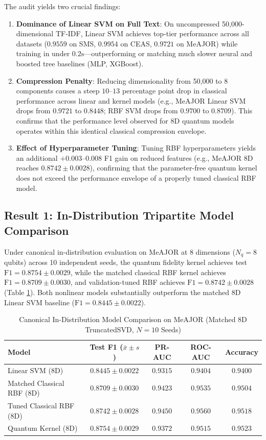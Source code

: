 \documentclass[10pt,twocolumn,letterpaper]{article}
\begin{document}
The audit yields two crucial findings:
\begin{enumerate}
    \item \textbf{Dominance of Linear SVM on Full Text}: On uncompressed 50,000-dimensional TF-IDF, Linear SVM achieves top-tier performance across all datasets ($0.9559$ on SMS, $0.9954$ on CEAS, $0.9721$ on MeAJOR) while training in under $0.2\text{s}$---outperforming or matching much slower neural and boosted tree baselines (MLP, XGBoost).
    \item \textbf{Compression Penalty}: Reducing dimensionality from 50,000 to 8 components causes a steep $10\text{--}13$ percentage point drop in classical performance across linear and kernel models (e.g., MeAJOR Linear SVM drops from $0.9721$ to $0.8448$; RBF SVM drops from $0.9700$ to $0.8709$). This confirms that the performance level observed for 8D quantum models operates within this identical classical compression envelope.
    \item \textbf{Effect of Hyperparameter Tuning}: Tuning RBF hyperparameters yields an additional $+0.003\text{--}0.008$ F1 gain on reduced features (e.g., MeAJOR 8D reaches $0.8742 \pm 0.0028$), confirming that the parameter-free quantum kernel does not exceed the performance envelope of a properly tuned classical RBF model.
\end{enumerate}

\subsection{Result 1: In-Distribution Tripartite Model Comparison}
Under canonical in-distribution evaluation on MeAJOR at 8 dimensions ($N_q = 8$ qubits) across 10 independent seeds, the quantum fidelity kernel achieves test $\text{F1} = 0.8754 \pm 0.0029$, while the matched classical RBF kernel achieves $\text{F1} = 0.8709 \pm 0.0030$, and validation-tuned RBF achieves $\text{F1} = 0.8742 \pm 0.0028$ (Table \ref{tab:canonical_comparison}). Both nonlinear models substantially outperform the matched 8D Linear SVM baseline ($\text{F1} = 0.8445 \pm 0.0022$).

\begin{table}[t]
\centering
\scriptsize
\caption{Canonical In-Distribution Model Comparison on MeAJOR (Matched 8D TruncatedSVD, $N=10$ Seeds)}
\label{tab:canonical_comparison}
\setlength{\tabcolsep}{2pt}
\begin{tabular}{lcccc}
\toprule
Model & Test F1 ($\bar{x} \pm s$) & PR-AUC & ROC-AUC & Accuracy \\
\midrule
Linear SVM (8D) & $0.8445 \pm 0.0022$ & $0.9315$ & $0.9404$ & $0.9400$ \\
Matched Classical RBF (8D) & $0.8709 \pm 0.0030$ & $0.9423$ & $0.9535$ & $0.9504$ \\
Tuned Classical RBF (8D) & $0.8742 \pm 0.0028$ & $0.9450$ & $0.9560$ & $0.9518$ \\
Quantum Kernel (8D) & $0.8754 \pm 0.0029$ & $0.9372$ & $0.9515$ & $0.9523$ \\
\bottomrule
\end{tabular}
\end{table}
\end{document}
